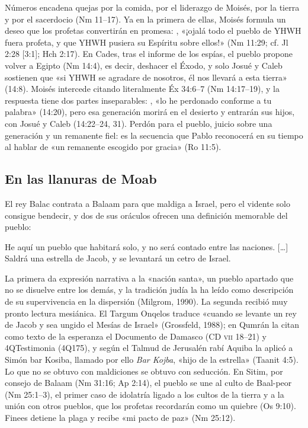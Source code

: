 Números encadena quejas por la comida, por el liderazgo de Moisés, por la tierra y por el sacerdocio (Nm 11–17). Ya en la primera de ellas, Moisés formula un deseo que los profetas convertirán en promesa: , «¡ojalá todo el pueblo de YHWH fuera profeta, y que YHWH pusiera su Espíritu sobre ellos!» (Nm 11:29; cf. Jl 2:28 [3:1]; Hch 2:17). En Cades, tras el informe de los espías, el pueblo propone volver a Egipto (Nm 14:4), es decir, deshacer el Éxodo, y solo Josué y Caleb sostienen que «si YHWH se agradare de nosotros, él nos llevará a esta tierra» (14:8). Moisés intercede citando literalmente Éx 34:6–7 (Nm 14:17–19), y la respuesta tiene dos partes inseparables: , «lo he perdonado conforme a tu palabra» (14:20), pero esa generación morirá en el desierto y entrarán sus hijos, con Josué y Caleb (14:22–24, 31). Perdón para el pueblo, juicio sobre una generación y un remanente fiel: es la secuencia que Pablo reconocerá en su tiempo al hablar de «un remanente escogido por gracia» (Ro 11:5).

\subsection{En las llanuras de Moab}
El rey Balac contrata a Balaam para que maldiga a Israel, pero el vidente solo consigue bendecir, y dos de sus oráculos ofrecen una definición memorable del pueblo:

\begin{cita}He aquí un pueblo que habitará solo, y no será contado entre las naciones. [\ldots] Saldrá una estrella de Jacob, y se levantará un cetro de Israel.\end{cita}

La primera da expresión narrativa a la «nación santa», un pueblo apartado que no se disuelve entre los demás, y la tradición judía la ha leído como descripción de su supervivencia en la dispersión (Milgrom, 1990). La segunda recibió muy pronto lectura mesiánica. El Targum Onqelos traduce «cuando se levante un rey de Jacob y sea ungido el Mesías de Israel» (Grossfeld, 1988); en Qumrán la citan como texto de la esperanza el Documento de Damasco (CD \textsc{vii} 18–21) y 4QTestimonia (4Q175), y según el Talmud de Jerusalén rabí Aquiba la aplicó a Simón bar Kosiba, llamado por ello \emph{Bar Kojba}, «hijo de la estrella» (Taanit 4:5). Lo que no se obtuvo con maldiciones se obtuvo con seducción. En Sitim, por consejo de Balaam (Nm 31:16; Ap 2:14), el pueblo se une al culto de Baal-peor (Nm 25:1–3), el primer caso de idolatría ligado a los cultos de la tierra y a la unión con otros pueblos, que los profetas recordarán como un quiebre (Os 9:10). Finees detiene la plaga y recibe «mi pacto de paz» (Nm 25:12).

